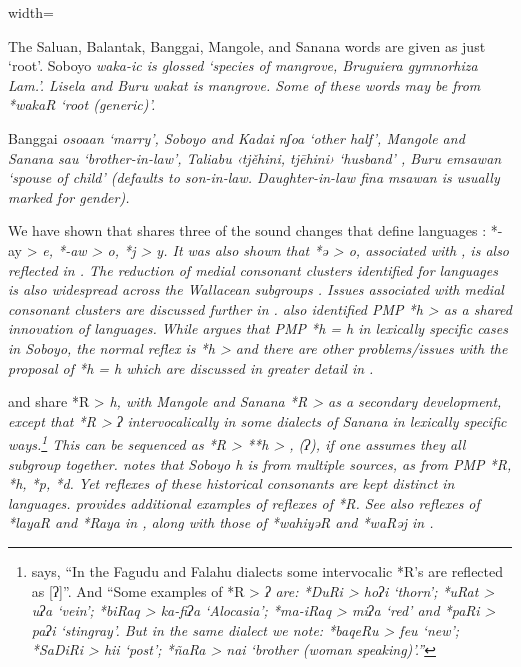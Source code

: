 \begin{table}
\begin{adjustbox}{width=\textwidth}
\begin{threeparttable}
		\begin{tablenotes}\tnsize
			\item[†]	{The Saluan,
								Balantak, Banggai, Mangole, and Sanana words are given as just ‘root’.
								Soboyo \it{waka-ic} is glossed ‘species of mangrove, \it{Bruguiera gymnorhiza Lam.}’.
								Lisela and Buru \it{wakat} is mangrove.
								Some of these words may be from *wakaR ‘root (generic)’.}
			\item[‡]	{Banggai \it{osoaan} ‘marry’,
								Soboyo and Kadai \it{nʃoa} ‘other half’,
								Mangole and Sanana \it{sau} ‘brother-in-law’,
								Taliabu ‹tjěhini, tjēhini› ‘husband’ \citep[6]{Stokhof1980b},
								Buru \it{emsawan} ‘spouse of child' (defaults to son-in-law.
								Daughter-in-law \it{fina msawan} is usually marked for gender).}
		\end{tablenotes}
	\end{threeparttable}
\end{adjustbox}
\end{table}

We have shown that  shares three of the sound changes
that define  languages \citep{Mead2003a}: *-ay >
\it{e}, *-aw > \it{o}, *j > \it{y}.
It was also shown that *ə > \it{o,} associated with , is also reflected in .
The reduction of medial consonant clusters identified for 
languages \citep{Mead2003a} is also widespread across the
Wallacean subgroups \citep{Blust1993}.
Issues associated with medial consonant clusters
are discussed further in .
\citet{Mead2003a} also identified PMP *h > {\0}
as a shared innovation of  languages.
While \citet{Blust1981} argues that PMP *h = \it{h} in lexically
specific cases in Soboyo,
the normal reflex is *h > {\0}
and there are other problems/issues with the proposal of *h =
\it{h} which are discussed in greater detail in .

 and  share *R > \it{h},
with Mangole and Sanana *R > {\0} as a secondary development,
except that *R > ʔ intervocalically in some dialects of Sanana
in lexically specific ways.\footnote{
\cite[33, 43]{Collins1981} says,
“In the Fagudu and Falahu dialects some intervocalic *R's are reflected as [ʔ]”.
And “Some examples of *R > \it{ʔ} are: *DuRi > \it{hoʔi} ‘thorn’;
*uRat > \it{uʔa} ‘vein’; *biRaq > \it{ka-fiʔa} ‘Alocasia’; *ma-iRaq
> \it{miʔa} ‘red’ and *paRi > \it{paʔi} ‘stingray’.
But in the same dialect we note: *baqeRu > \it{feu} ‘new’; *SaDiRi
> \it{hii} ‘post’; *ñaRa > \it{nai} ‘brother (woman speaking)’.”}
  This can be sequenced as *R > **h > {\0},
(\it{ʔ}), if one assumes they all subgroup together.
\citet{Blust1981} notes that Soboyo \it{h} is from multiple sources,
as from PMP *R, *h, *p, *d.
Yet reflexes of these historical consonants
are kept distinct in  languages.
 provides additional examples of reflexes of *R.
See also reflexes of *layaR
and *Raya in ,
along with those of *wahiyəR
and *waRəj in .

